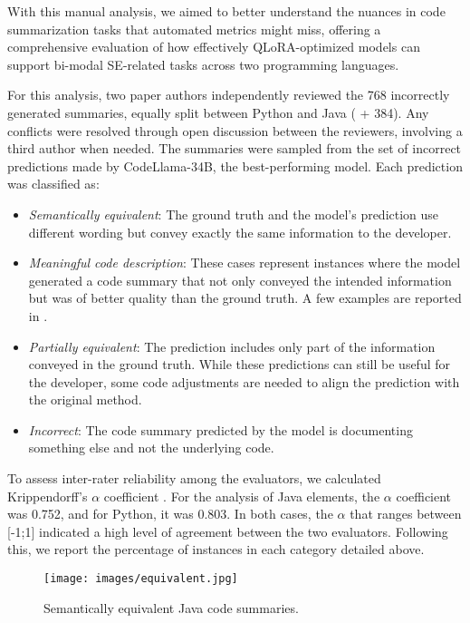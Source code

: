 With this manual analysis, we aimed to better understand the nuances in code summarization tasks that automated metrics might miss, offering a comprehensive evaluation of how effectively QLoRA-optimized models can support bi-modal SE-related tasks across two programming languages.

For this analysis, two paper authors  independently reviewed the 768 incorrectly generated summaries, equally split between Python and Java ( + 384). Any conflicts were resolved through open discussion between the reviewers, involving a third author when needed. The summaries were sampled from the set of incorrect predictions made by CodeLlama-34B, the best-performing model. Each prediction was classified as:


\begin{itemize} 
	\item  \emph{Semantically equivalent}: The ground truth and the model’s prediction use different wording but convey exactly the same information to the developer.
	
	\item \emph{Meaningful code description}: These cases represent instances where the model generated a code summary that not only conveyed the intended information but was of better quality than the ground truth.
	A few examples are reported in .
	
	\item \emph{Partially equivalent}: The prediction includes only part of the information conveyed in the ground truth. While these predictions can still be useful for the developer, some code adjustments are needed to align the prediction with the original method.
	
	\item \emph{Incorrect}: The code summary predicted by the model is documenting something else and not the underlying code.

\end{itemize}

To assess inter-rater reliability among the evaluators, we calculated Krippendorff’s $\alpha$ coefficient \cite{krippendorff2011computing}. For the analysis of Java elements, the $\alpha$ coefficient was 0.752, and for Python, it was 0.803. In both cases, the $\alpha$ that ranges between [-1;1] indicated a high level of agreement between the two evaluators. Following this, we report the percentage of instances in each category detailed above.



\begin{figure}[t]
	\centering
	\texttt{[image: images/equivalent.jpg]}
	\caption{Semantically equivalent Java code summaries.} %
	\label{fig:semantically-equivalent}
\end{figure}

%



